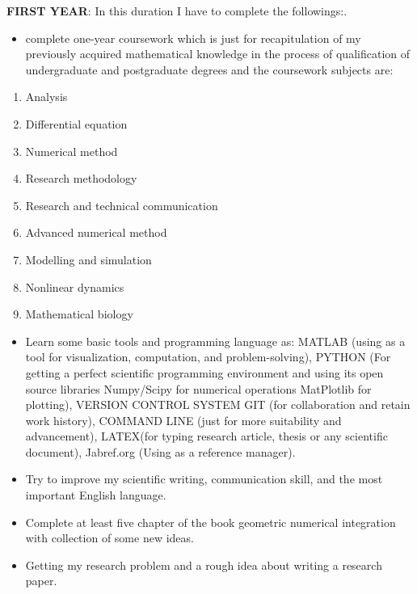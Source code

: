 \documentclass[PhD]{iitmdiss}
\begin{document}
    {\textbf{FIRST YEAR}:{ In this duration I have to complete the followings:.}\\
    \begin{itemize}
    \item{complete one-year coursework  which is just for recapitulation of my previously acquired mathematical knowledge in the process of qualification of undergraduate and postgraduate degrees and the coursework subjects are:
}\\
\end{itemize}
\begin{enumerate}
    \item { Analysis}
    \item{ Differential equation}
    \item{ Numerical method}
    \item{ Research methodology}
    \item{ Research and technical communication}
    \item{ Advanced numerical method}
    \item{ Modelling and simulation}
    \item{ Nonlinear dynamics}
    \item{ Mathematical biology}
\end{enumerate}
\begin{itemize}
    \item {Learn some basic tools and programming language as: MATLAB (using as a tool for visualization, computation, and problem-solving), PYTHON (For getting a perfect scientific programming environment and using its open source libraries Numpy/Scipy for numerical operations MatPlotlib for plotting), VERSION CONTROL SYSTEM GIT (for collaboration and retain work history), COMMAND LINE (just for more suitability and advancement), LATEX(for typing research article, thesis or any scientific document), Jabref.org (Using as a reference manager).}\\
    
    \item{Try to improve my scientific writing, communication skill, and the most important English language.}\\
    \item{Complete at least five chapter of the book geometric numerical integration with collection of some new ideas.
}\\
\item{Getting my research problem and a rough idea about writing a research paper.}\\
\end{itemize}
\par

}
\end{document}
